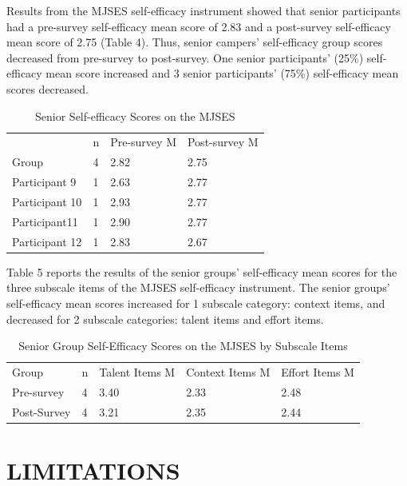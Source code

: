 \documentclass[11.5pt]{sig-alternate} %
\begin{document}
\begin{large}
Results from the MJSES self-efficacy instrument showed that senior participants had a pre-survey self-efficacy mean score of 2.83 and a post-survey self-efficacy mean score of 2.75 (Table 4). Thus, senior campers’ self-efficacy group scores decreased from pre-survey to post-survey. One senior participants’ (25\%) self-efficacy mean score increased and 3 senior participants’ (75\%) self-efficacy mean scores decreased.

\begin{table}[p]
\caption{Senior Self-efficacy Scores on the MJSES}
\begin{tabular}{llll}
\hline
 & n & Pre-survey M & Post-survey M \\
Group & 4 & 2.82 & 2.75 \\
Participant 9 & 1 & 2.63 & 2.77 \\
Participant 10 & 1 & 2.93 & 2.77 \\
Participant11 & 1 & 2.90 & 2.77 \\
Participant 12 & 1 & 2.83 & 2.67 \\ \hline
\end{tabular}
\end{table}

Table 5 reports the results of the senior groups’ self-efficacy mean scores for the three subscale items of the MJSES self-efficacy instrument. The senior groups’ self-efficacy mean scores increased for 1 subscale category: context items, and decreased for 2 subscale categories: talent items and effort items. 

\begin{table}[p]
\caption{Senior Group Self-Efficacy Scores on the MJSES by Subscale Items}
\begin{tabular}{lllll}
\hline
Group & n & Talent Items M & Context Items M & Effort Items M \\
Pre-survey & 4 & 3.40 & 2.33 & 2.48 \\
Post-Survey & 4 & 3.21 & 2.35 & 2.44 \\ \hline
\end{tabular}
\end{table}

\section*{LIMITATIONS}


\end{large}
\end{document}

